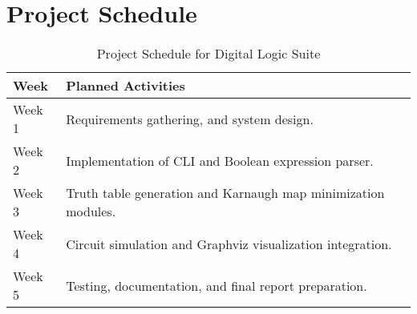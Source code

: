 \clearpage
\section{Project Schedule}
\begin{table}[ht!]
    \centering
    \begin{tabular}{|>{\raggedright}p{2cm}|p{10cm}|}
        \hline
        \textbf{Week} & \textbf{Planned Activities}                                   \\
        \hline
        Week 1        & Requirements gathering, and system design.                    \\
        \hline
        Week 2        & Implementation of CLI and Boolean expression parser.          \\
        \hline
        Week 3        & Truth table generation and Karnaugh map minimization modules. \\
        \hline
        Week 4        & Circuit simulation and Graphviz visualization integration.    \\
        \hline
        Week 5        & Testing, documentation, and final report preparation.         \\
        \hline
    \end{tabular}
    \caption{Project Schedule for Digital Logic Suite}
\end{table}